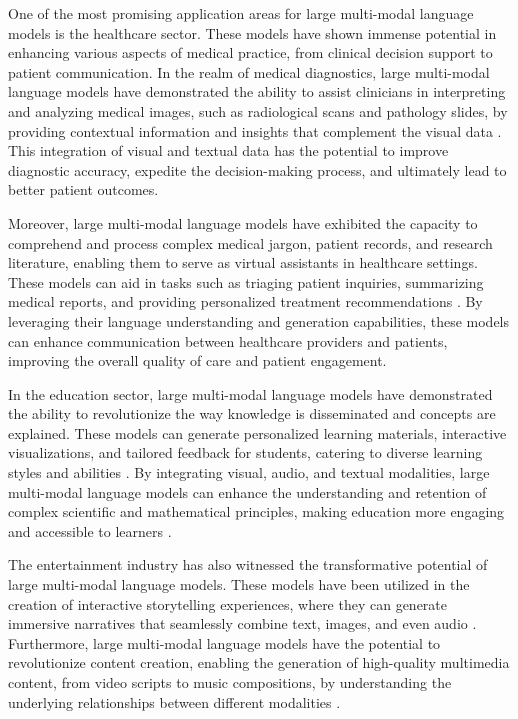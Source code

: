 \documentclass[11pt]{article}
\begin{document}
One of the most promising application areas for large multi-modal language models is the healthcare sector. These models have shown immense potential in enhancing various aspects of medical practice, from clinical decision support to patient communication. In the realm of medical diagnostics, large multi-modal language models have demonstrated the ability to assist clinicians in interpreting and analyzing medical images, such as radiological scans and pathology slides, by providing contextual information and insights that complement the visual data \cite{ref69,ref70}. This integration of visual and textual data has the potential to improve diagnostic accuracy, expedite the decision-making process, and ultimately lead to better patient outcomes.

Moreover, large multi-modal language models have exhibited the capacity to comprehend and process complex medical jargon, patient records, and research literature, enabling them to serve as virtual assistants in healthcare settings. These models can aid in tasks such as triaging patient inquiries, summarizing medical reports, and providing personalized treatment recommendations \cite{ref71,ref72}. By leveraging their language understanding and generation capabilities, these models can enhance communication between healthcare providers and patients, improving the overall quality of care and patient engagement.

In the education sector, large multi-modal language models have demonstrated the ability to revolutionize the way knowledge is disseminated and concepts are explained. These models can generate personalized learning materials, interactive visualizations, and tailored feedback for students, catering to diverse learning styles and abilities \cite{ref73}. By integrating visual, audio, and textual modalities, large multi-modal language models can enhance the understanding and retention of complex scientific and mathematical principles, making education more engaging and accessible to learners \cite{ref74}.

The entertainment industry has also witnessed the transformative potential of large multi-modal language models. These models have been utilized in the creation of interactive storytelling experiences, where they can generate immersive narratives that seamlessly combine text, images, and even audio \cite{ref29}. Furthermore, large multi-modal language models have the potential to revolutionize content creation, enabling the generation of high-quality multimedia content, from video scripts to music compositions, by understanding the underlying relationships between different modalities \cite{ref10}.
\end{document}
